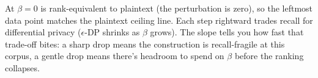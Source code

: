 At $\beta = 0$ \sap is rank-equivalent to plaintext (the
perturbation is zero), so the leftmost data point matches the
plaintext ceiling line. Each step rightward trades recall for
differential privacy ($\epsilon$-DP shrinks as $\beta$ grows).
The slope tells you how fast that trade-off bites: a sharp drop
means the \sap construction is recall-fragile at this corpus, a
gentle drop means there's headroom to spend on $\beta$ before the
ranking collapses.
